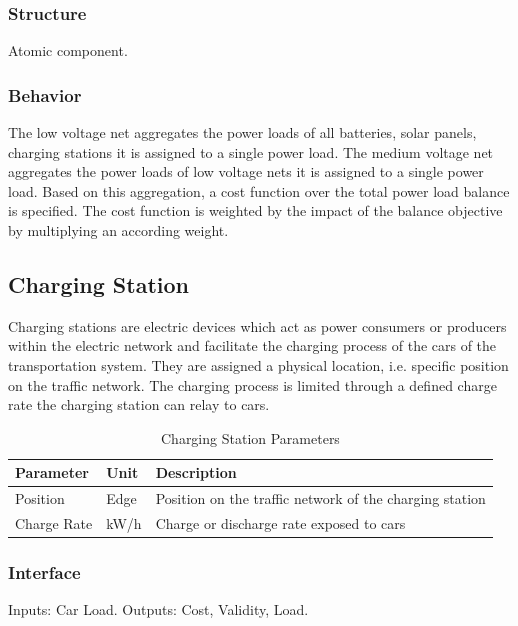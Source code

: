 \subsubsection{Structure}

Atomic component.

\subsubsection{Behavior}

The low voltage net aggregates the power loads of all batteries, solar panels, charging stations it is assigned to a single power load. The medium voltage net aggregates the power loads of low voltage nets it is assigned to a single power load. Based on this aggregation, a cost function over the total power load balance is specified. The cost function is weighted by the impact of the balance objective by multiplying an according weight.

\subsection{Charging Station}
Charging stations are electric devices which act as power consumers or producers within the electric network and facilitate the charging process of the cars of the transportation system. They are assigned a physical location, i.e. specific position on the traffic network. The charging process is limited through a defined charge rate the charging station can relay to cars.

\begin{table}[h]
	\renewcommand{\arraystretch}{1.3}
	\caption{Charging Station Parameters}
	\centering
	\begin{tabular}{lll}
		\hline
		\textbf{Parameter}       & \textbf{Unit} & \textbf{Description} \\ \hline
		Position      			 & Edge    	     & Position on the traffic network of the charging station \\  
		Charge Rate         	 & kW/h    		 & Charge or discharge rate exposed to cars     \\ \hline
	\end{tabular}
\end{table}

\subsubsection{Interface}

Inputs: Car Load. Outputs: Cost, Validity, Load.

